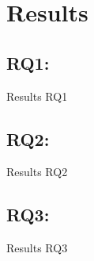 \section{Results}
\label{sec:results}

\subsection{RQ1: }
\label{sec:results_rq1}
Results RQ1

\subsection{RQ2: }
\label{sec:results_rq2}
Results RQ2

\subsection{RQ3: }
\label{sec:results_rq3}
Results RQ3